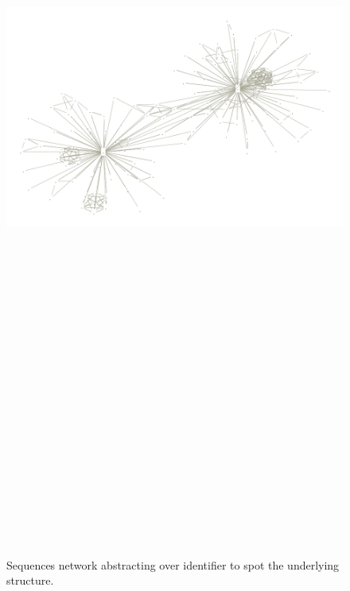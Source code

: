 \newpage
\begin{figure}
\begin{sideways}
\includegraphics[width=20cm, height=30cm]{OEIS/points}
\caption{Sequences network abstracting over identifier to spot the underlying
structure.}
\end{sideways}
\label{fig:oeis:sequences:network:fibonacci:catalan}
\end{figure}

